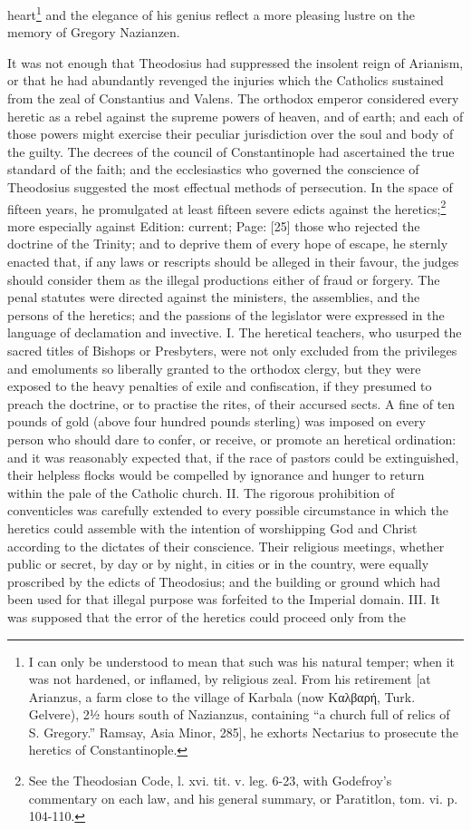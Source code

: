 heart\footnote{I can only be understood to mean that such was his natural temper; when it was not hardened, or inflamed, by religious zeal. From his retirement [at Arianzus, a farm close to the village of Karbala (now \textgreek{Καλβαρή}, Turk. Gelvere), 2½ hours south of Nazianzus, containing \texthebrew{“}a church full of relics of S. Gregory.\texthebrew{}” Ramsay, Asia Minor, 285], he exhorts Nectarius to prosecute the heretics of Constantinople.} and the elegance of his genius reflect a more pleasing lustre on the memory of Gregory Nazianzen.

It was not enough that Theodosius had suppressed the insolent reign of Arianism, or that he had abundantly revenged the injuries which the Catholics sustained from the zeal of Constantius and Valens. The orthodox emperor considered every heretic as a rebel against the supreme powers of heaven, and of earth; and each of those powers might exercise their peculiar jurisdiction over the soul and body of the guilty. The decrees of the council of Constantinople had ascertained the true standard of the faith; and the ecclesiastics who governed the conscience of Theodosius suggested the most effectual methods of persecution. In the space of fifteen years, he promulgated at least fifteen severe edicts against the heretics;\footnote{See the Theodosian Code, l. xvi. tit. v. leg. 6-23, with Godefroy\texthebrew{}’s commentary on each law, and his general summary, or Paratitlon, tom. vi. p. 104-110.} more especially against Edition: current; Page: [25] those who rejected the doctrine of the Trinity; and to deprive them of every hope of escape, he sternly enacted that, if any laws or rescripts should be alleged in their favour, the judges should consider them as the illegal productions either of fraud or forgery. The penal statutes were directed against the ministers, the assemblies, and the persons of the heretics; and the passions of the legislator were expressed in the language of declamation and invective. I. The heretical teachers, who usurped the sacred titles of Bishops or Presbyters, were not only excluded from the privileges and emoluments so liberally granted to the orthodox clergy, but they were exposed to the heavy penalties of exile and confiscation, if they presumed to preach the doctrine, or to practise the rites, of their accursed sects. A fine of ten pounds of gold (above four hundred pounds sterling) was imposed on every person who should dare to confer, or receive, or promote an heretical ordination: and it was reasonably expected that, if the race of pastors could be extinguished, their helpless flocks would be compelled by ignorance and hunger to return within the pale of the Catholic church. II. The rigorous prohibition of conventicles was carefully extended to every possible circumstance in which the heretics could assemble with the intention of worshipping God and Christ according to the dictates of their conscience. Their religious meetings, whether public or secret, by day or by night, in cities or in the country, were equally proscribed by the edicts of Theodosius; and the building or ground which had been used for that illegal purpose was forfeited to the Imperial domain. III. It was supposed that the error of the heretics could proceed only from the 